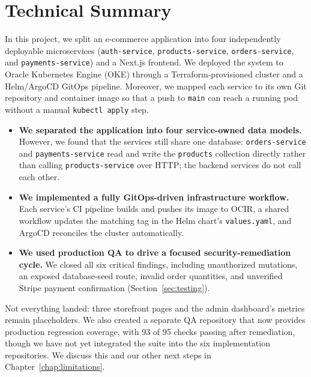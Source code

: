 \chapter*{Technical Summary}
\label{chap:abstract}
\pagestyle{plain}

In this project, we split an e-commerce application into four independently
deployable microservices (\texttt{auth-service}, \texttt{products-service},
\texttt{orders-service}, and \texttt{payments-service}) and a Next.js frontend.
We deployed the system to Oracle Kubernetes Engine (OKE) through a
Terraform-provisioned cluster and a Helm/ArgoCD GitOps pipeline. Moreover, we
mapped each service to its own Git repository and container image so that a push
to \texttt{main} can reach a running pod without a manual \texttt{kubectl apply}
step.

\begin{itemize}[leftmargin=1.4em]
  \item \textbf{We separated the application into four service-owned data models.}
        However, we found that the services still share one database:
        \texttt{orders-service} and \texttt{payments-service} read and write the
        \texttt{products} collection directly rather than calling
        \texttt{products-service} over HTTP; the backend services do not call each
        other.
  \item \textbf{We implemented a fully GitOps-driven infrastructure workflow.}
        Each service's CI pipeline builds and pushes its image to OCIR, a shared
        workflow updates the matching tag in the Helm chart's
        \texttt{values.yaml}, and ArgoCD reconciles the cluster automatically.
  \item \textbf{We used production QA to drive a focused security-remediation
        cycle.} We closed all six critical findings, including unauthorized mutations,
        an exposed database-seed route, invalid order quantities, and unverified
        Stripe payment confirmation (Section~\ref{sec:testing}).
\end{itemize}

Not everything landed: three storefront pages and the admin dashboard's metrics
remain placeholders. We also created a separate QA repository that now provides
production regression coverage, with 93 of 95 checks passing after remediation,
though we have not yet integrated the suite into the six implementation
repositories. We discuss this and our other next steps in
Chapter~\ref{chap:limitations}.
